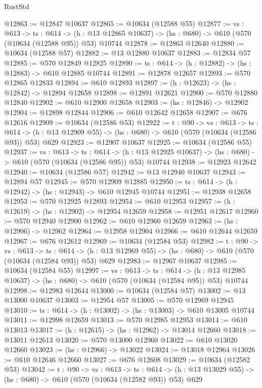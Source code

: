 \begin{lexlean}{RustStd}
\begin{coremodule}
@12863 := @12847 @10637
@12865 := @10634 (@12588 @55)
@12877 := {vs : @613} ->
  {ts : @614} ->
  (h : @13 @12865 @10637) -> (hs : @680) -> @610 (@570 (@10634 (@12588 @95)) @53) @10744
@12878 := @12863 @12640
@12880 := @10634 (@12588 @57)
@12882 := @13 @12880 @10637
@12883 := @12834 @57
@12885 := @570 @12849 @12825
@12890 := {ts : @614} -> (h : @12882) -> (hs : @12883) -> @610 @12885 @10744
@12891 := @12878 @12657
@12893 := @570 @12865 @12833
@12894 := @610 @12893
@12897 := (h : @12623) -> (hs : @12842) -> @12894 @12658
@12898 := @12891 @12621
@12900 := @570 @12880 @12840
@12902 := @610 @12900 @12658
@12903 := (hs : @12846) -> @12902
@12904 := @12898 @12844
@12906 := @610 @12642 @12658
@12907 := @676 @12616
@12909 := @10634 (@12586 @53)
@12922 := {t : @90} ->
  {vs : @613} ->
  {ts : @614} -> (h : @13 @12909 @55) -> (hs : @680) -> @610 (@570 (@10634 (@12586 @93)) @53) @629
@12923 := @12907 @10637
@12925 := @10634 (@12586 @55)
@12937 := {vs : @613} ->
  {ts : @614} ->
  (h : @13 @12925 @10637) -> (hs : @680) -> @610 (@570 (@10634 (@12586 @95)) @53) @10744
@12938 := @12923 @12642
@12940 := @10634 (@12586 @57)
@12942 := @13 @12940 @10637
@12943 := @12894 @57
@12945 := @570 @12909 @12885
@12950 := {ts : @614} -> (h : @12942) -> (hs : @12943) -> @610 @12945 @10744
@12951 := @12938 @12658
@12953 := @570 @12925 @12893
@12954 := @610 @12953
@12957 := (h : @12619) -> (hs : @12902) -> @12954 @12659
@12958 := @12951 @12617
@12960 := @570 @12940 @12900
@12962 := @610 @12960 @12659
@12963 := (hs : @12906) -> @12962
@12964 := @12958 @12904
@12966 := @610 @12644 @12659
@12967 := @676 @12612
@12969 := @10634 (@12584 @53)
@12982 := {t : @90} ->
  {vs : @613} ->
  {ts : @614} -> (h : @13 @12969 @55) -> (hs : @680) -> @610 (@570 (@10634 (@12584 @93)) @53) @629
@12983 := @12967 @10637
@12985 := @10634 (@12584 @55)
@12997 := {vs : @613} ->
  {ts : @614} ->
  (h : @13 @12985 @10637) -> (hs : @680) -> @610 (@570 (@10634 (@12584 @95)) @53) @10744
@12998 := @12983 @12644
@13000 := @10634 (@12584 @57)
@13002 := @13 @13000 @10637
@13003 := @12954 @57
@13005 := @570 @12969 @12945
@13010 := {ts : @614} -> (h : @13002) -> (hs : @13003) -> @610 @13005 @10744
@13011 := @12998 @12659
@13013 := @570 @12985 @12953
@13014 := @610 @13013
@13017 := (h : @12615) -> (hs : @12962) -> @13014 @12660
@13018 := @13011 @12613
@13020 := @570 @13000 @12960
@13022 := @610 @13020 @12660
@13023 := (hs : @12966) -> @13022
@13024 := @13018 @12964
@13026 := @610 @12646 @12660
@13027 := @676 @12608
@13029 := @10634 (@12582 @53)
@13042 := {t : @90} ->
  {vs : @613} ->
  {ts : @614} -> (h : @13 @13029 @55) -> (hs : @680) -> @610 (@570 (@10634 (@12582 @93)) @53) @629

\end{coremodule}
\end{lexlean}

